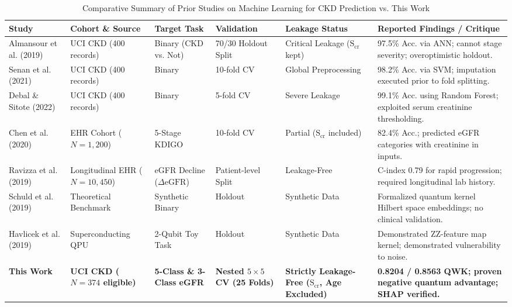 \documentclass[conference]{IEEEtran}
\begin{document}
\begin{table}[t]
\centering
\caption{Comparative Summary of Prior Studies on Machine Learning for CKD Prediction vs. This Work}
\label{tab:lit_comparison}
\renewcommand{\arraystretch}{1.15}
\begin{tabularx}{\textwidth}{lXllp{3.2cm}X}
\toprule
\textbf{Study} & \textbf{Cohort \& Source} & \textbf{Target Task} & \textbf{Validation} & \textbf{Leakage Status} & \textbf{Reported Findings / Critique} \\
\midrule
Almansour et al. (2019)~\cite{almansour2019neural} & UCI CKD (400 records) & Binary (CKD vs. Not) & 70/30 Holdout Split & Critical Leakage ($\text{S}_{\text{cr}}$ kept) & 97.5\% Acc. via ANN; cannot stage severity; overoptimistic holdout. \\
Senan et al. (2021)~\cite{senan2021machine} & UCI CKD (400 records) & Binary & 10-fold CV & Global Preprocessing & 98.2\% Acc. via SVM; imputation executed prior to fold splitting. \\
Debal \& Sitote (2022)~\cite{debal2022comparative} & UCI CKD (400 records) & Binary & 5-fold CV & Severe Leakage & 99.1\% Acc. using Random Forest; exploited serum creatinine thresholding. \\
Chen et al. (2020)~\cite{chen2020machine} & EHR Cohort ($N = 1,200$) & 5-Stage KDIGO & 10-fold CV & Partial ($\text{S}_{\text{cr}}$ included) & 82.4\% Acc.; predicted eGFR categories with creatinine in inputs. \\
Ravizza et al. (2019)~\cite{ravizza2019predicting} & Longitudinal EHR ($N = 10,450$) & eGFR Decline ($\Delta\text{eGFR}$) & Patient-level Split & Leakage-Free & C-index 0.79 for rapid progression; required longitudinal lab history. \\
Schuld et al. (2019)~\cite{schuld2019quantum} & Theoretical Benchmark & Synthetic Binary & Holdout & Synthetic Data & Formalized quantum kernel Hilbert space embeddings; no clinical validation. \\
Havlicek et al. (2019)~\cite{havlicek2019supervised} & Superconducting QPU & 2-Qubit Toy Task & Holdout & Synthetic Data & Demonstrated ZZ-feature map kernel; demonstrated vulnerability to noise. \\
\textbf{This Work} & \textbf{UCI CKD ($N = 374$ eligible)} & \textbf{5-Class \& 3-Class eGFR} & \textbf{Nested $5 \times 5$ CV (25 Folds)} & \textbf{Strictly Leakage-Free ($\text{S}_{\text{cr}}$, Age Excluded)} & \textbf{0.8204 / 0.8563 QWK; proven negative quantum advantage; SHAP verified.} \\
\bottomrule
\end{tabularx}
\end{table}
\end{document}
